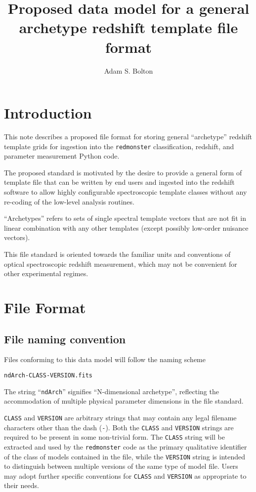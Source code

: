 \documentclass[12pt]{article}
\begin{document}
\title{Proposed data model for a general archetype
redshift template file format}

\author{Adam S. Bolton}

\maketitle

\section{Introduction}

This note describes a proposed file format for storing general
``archetype'' redshift template grids for ingestion into
the \texttt{redmonster} classification, redshift, and parameter
measurement Python code.

The proposed standard is motivated by the desire to provide a general
form of template file that can be written by end users and ingested
into the redshift software to allow highly configurable spectroscopic
template classes without any re-coding of the low-level analysis routines.

``Archetypes'' refers to sets of single spectral template vectors that are not
fit in linear combination with any other templates (except possibly
low-order nuisance vectors).

This file standard is oriented towards the familiar units and conventions
of optical spectroscopic redshift measurement, which may not be convenient
for other experimental regimes.

\section{File Format}

\subsection{File naming convention}

Files conforming to this data model will follow the naming scheme

\hspace*{36pt}\texttt{ndArch-CLASS-VERSION.fits}

The string ``\texttt{ndArch}'' signifies ``N-dimensional archetype'',
reflecting the accommodation of multiple physical parameter dimensions
in the file standard.

\texttt{CLASS} and \texttt{VERSION} are arbitrary
strings that may contain any legal filename
characters other than the dash (\texttt{-}).  Both the \texttt{CLASS}
and \texttt{VERSION} strings are required to be present in
some non-trivial form.  The \texttt{CLASS} string will be extracted
and used by the \texttt{redmonster} code as the primary qualitative
identifier of the class of models contained in the file,
while the \texttt{VERSION} string is intended to distinguish
between multiple versions of the same type of model file.
Users may adopt further specific conventions for \texttt{CLASS}
and \texttt{VERSION} as appropriate to their needs.
\end{document}
